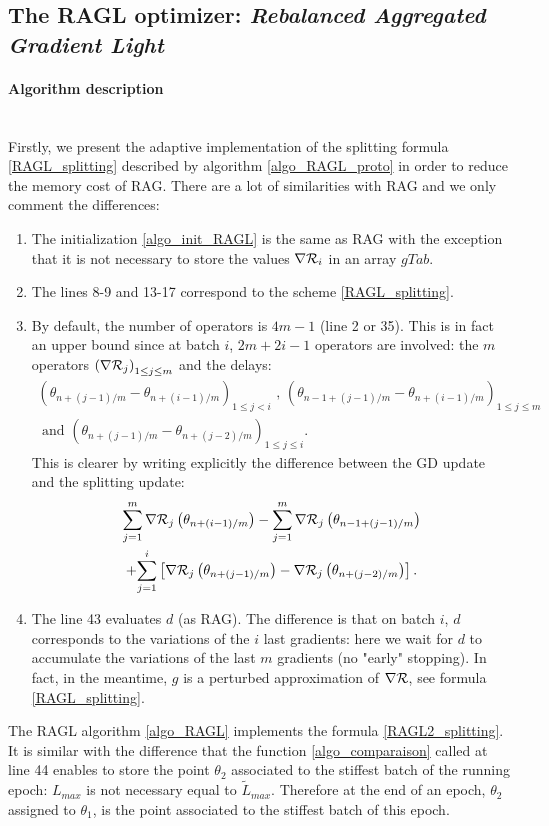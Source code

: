 \subsection{The RAGL optimizer: {\it Rebalanced Aggregated Gradient Light}}

\paragraph{Algorithm description}
~~\\
Firstly, we present the adaptive implementation of the splitting formula \eqref{RAGL_splitting} described by algorithm \ref{algo_RAGL_proto} in order to reduce the memory cost of RAG. There are a lot of similarities with RAG and we only comment the differences:
\begin{enumerate}
	\item The initialization \ref{algo_init_RAGL} is the same as RAG with the exception that it is not necessary to store the values $\nabla \mathcal{R}_i$ in an array $gTab$.
	\item The lines 8-9 and 13-17 correspond to the scheme \eqref{RAGL_splitting}.
	\item By default, the number of operators is $4m-1$ (line 2 or 35). This is in fact an upper bound since at batch $i$, $2m+2i-1$ operators are involved: the $m$ operators $\left(\nabla \mathcal{R}_j\right)_{1\leq j \leq m}$ and the delays:
	\begin{multline*}
		\left(\theta_{n+(j-1)/m}-\theta_{n+(i-1)/m}\right)_{1\leq j<i} \text{ , } \left(\theta_{n-1+(j-1)/m}-\theta_{n+(i-1)/m}\right)_{1\leq j \leq m} \\ 
		\text{ and } \left(\theta_{n+(j-1)/m}-\theta_{n+(j-2)/m}\right)_{1\leq j \leq i}.
	\end{multline*}
	This is clearer by writing explicitly the difference between the GD update and the splitting update:
	\begin{multline*}
		\sum_{j=1}^m \nabla \mathcal{R}_j\left(\theta_{n+(i-1)/m}\right) - \sum_{j=1}^m \nabla \mathcal{R}_j\left(\theta_{n-1+(j-1)/m}\right) \\
		 + \displaystyle{\sum_{j=1}^i} \left[\nabla \mathcal{R}_j\left(\theta_{n+(j-1)/m}\right)-\nabla \mathcal{R}_j\left(\theta_{n+(j-2)/m}\right)\right]. 
	\end{multline*}
	\item The line 43 evaluates $d$ (as RAG). The difference is that on batch $i$, $d$ corresponds to the variations of the $i$ last gradients: here we wait for $d$ to accumulate the variations of the last $m$ gradients (no "early" stopping). In fact, in the meantime, $g$ is a perturbed approximation of $\nabla \mathcal{R}$, see formula \eqref{RAGL_splitting}.
\end{enumerate}
The RAGL algorithm \ref{algo_RAGL} implements the formula \eqref{RAGL2_splitting}. It is similar with the difference that the function \eqref{algo_comparaison} called at line 44 enables to store the point $\theta_2$ associated to the stiffest batch of the running epoch: $L_{max}$ is not necessary equal to $\tilde{L}_{max}$. Therefore at the end of an epoch, $\theta_2$ assigned to $\theta_1$, is the point associated to the stiffest batch of this epoch. \\

